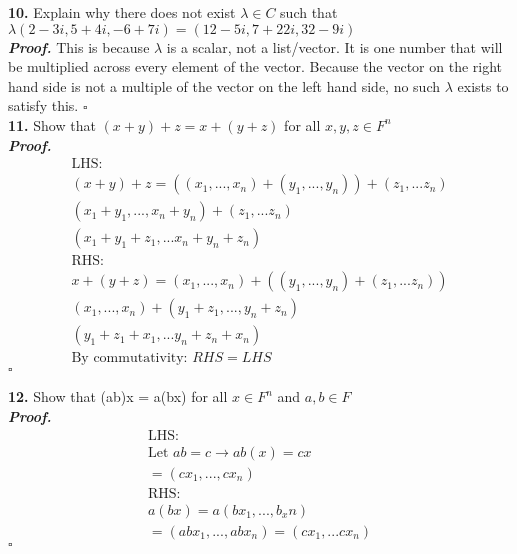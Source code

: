 \documentclass[12pt]{article} %
\newenvironment{solution}[1][\it{Proof}]{\textbf{#1. } }{$\square$}
\begin{document}
\textbf{10.} Explain why there does not exist $\lambda \in C$ such that $\lambda(2-3i,5+4i,-6+7i) = (12-5i,7+22i,32-9i)$\\ 

\begin{solution}
This is because $\lambda$ is a scalar, not a list/vector. It is one number that will be multiplied across every element of the vector. Because the vector on the right hand side is not a multiple of the vector on the left hand side, no such $\lambda$ exists to satisfy this. 
\end{solution}\\

\textbf{11.} Show that $(x+y)+z = x + (y+z)$ for all $x,y,z \in F^n$ \\ 

\begin{solution}
\begin{align*}
    & \text{LHS: } & \\
    & (x+y) + z = ((x_1, ... , x_n) +(y_1,...,y_n)) + (z_1,...z_n) & \\
    & (x_1 + y_1, ..., x_n + y_n) + (z_1,...z_n) & \\
    & (x_1 + y_1+z_1,...x_n+y_n+z_n) & \\
    & \text{RHS: } & \\
    & x + (y+z) = (x_1, ... , x_n) +((y_1,...,y_n) + (z_1,...z_n)) & \\
    & (x_1, ... , x_n) + (y_1 + z_1, ..., y_n + z_n) & \\
    & (y_1+ z_1 + x_1 ,...y_n+z_n+x_n) & \\
    & \text{By commutativity: } RHS = LHS
\end{align*}
\end{solution}

\textbf{12.} Show that (ab)x = a(bx) for all $x \in F^n$ and $a,b \in F$ \\

\begin{solution}
\begin{align*}
    & \text{LHS: } & \\
    & \text{Let } ab = c \rightarrow ab(x) = cx & \\
    & = (cx_1,...,cx_n) & \\
    & \text{RHS: } & \\
    & a(bx) = a(bx_1,...,b_xn) & \\
    & = (abx_1,...,abx_n) = (cx_1,...cx_n) &
\end{align*}
\end{solution}
\end{document}
